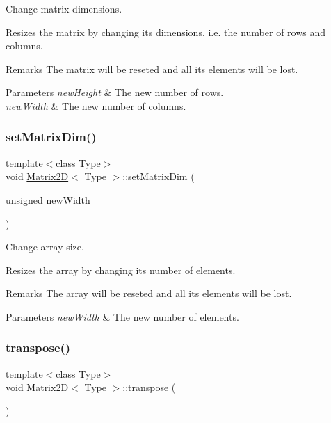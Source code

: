 Change matrix dimensions. 

Resizes the matrix by changing its dimensions, i.\+e. the number of rows and columns. \begin{DoxyRemark}{Remarks}
The matrix will be reseted and all its elements will be lost. 
\end{DoxyRemark}

\begin{DoxyParams}{Parameters}
{\em new\+Height} & The new number of rows. \\
\hline
{\em new\+Width} & The new number of columns. \\
\hline
\end{DoxyParams}
\mbox{\label{classMatrix2D_a02d8df2be95d08423b44009ffe01c12f}} 
\subsubsection{\texorpdfstring{set\+Matrix\+Dim()}{setMatrixDim()}\hspace{0.1cm}{\footnotesize\ttfamily [2/2]}}
{\footnotesize\ttfamily template$<$class Type$>$ \\
void \hyperlink{classMatrix2D}{Matrix2D}$<$ Type $>$\+::set\+Matrix\+Dim (\begin{DoxyParamCaption}\item[{unsigned}]{new\+Width }\end{DoxyParamCaption})\hspace{0.3cm}{\ttfamily [inline]}}



Change array size. 

Resizes the array by changing its number of elements. \begin{DoxyRemark}{Remarks}
The array will be reseted and all its elements will be lost. 
\end{DoxyRemark}

\begin{DoxyParams}{Parameters}
{\em new\+Width} & The new number of elements. \\
\hline
\end{DoxyParams}
\mbox{\label{classMatrix2D_a788abe5e1fbd6a1fbd0d445aca4f8300}} 
\subsubsection{\texorpdfstring{transpose()}{transpose()}}
{\footnotesize\ttfamily template$<$class Type$>$ \\
void \hyperlink{classMatrix2D}{Matrix2D}$<$ Type $>$\+::transpose (\begin{DoxyParamCaption}{ }\end{DoxyParamCaption})\hspace{0.3cm}{\ttfamily [inline]}}



